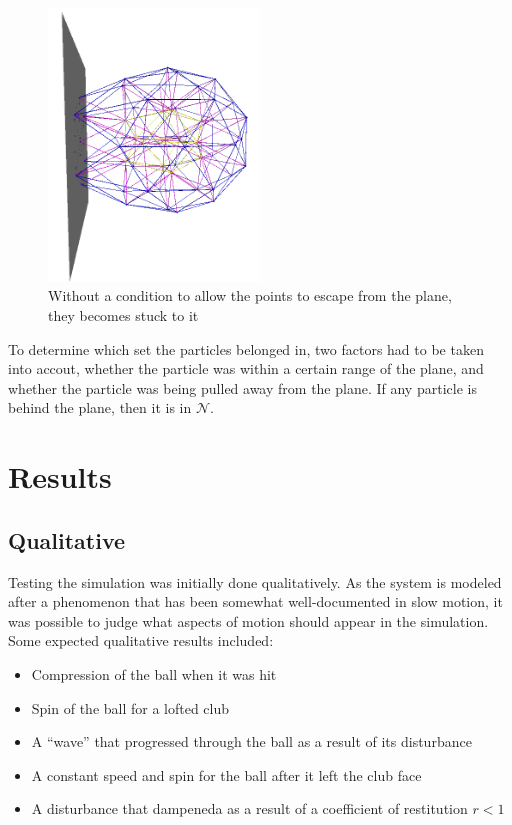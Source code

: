 \documentclass{article}
\begin{document}
\begin{figure}[h]
\centering
\includegraphics[width = 0.5\textwidth]{stuck_points.png}
\caption{Without a condition to allow the points to escape from the plane, they becomes stuck to it}
\label{fig:stuck}
\end{figure}

To determine which set the particles belonged in, two factors had to be taken into accout, whether the particle was within a certain range of the plane, and whether the particle was being pulled away from the plane. If any particle is behind the plane, then it is in $\mathcal{N}$. 

\section{Results}

\subsection{Qualitative}
Testing the simulation was initially done qualitatively. As the system is modeled after a phenomenon that has been somewhat well-documented in slow motion, it was possible to judge what aspects of motion should appear in the simulation. Some expected qualitative results included:

\begin{itemize}
\item Compression of the ball when it was hit
\item Spin of the ball for a lofted club
\item A ``wave'' that progressed through the ball as a result of its disturbance
\item A constant speed and spin for the ball after it left the club face
\item A disturbance that dampeneda as a result of a coef\mbox{f}icient of restitution $r < 1$
\end{itemize}
\end{document}
